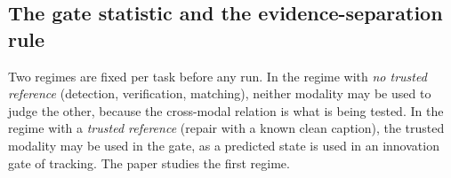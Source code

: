\begin{algorithm}[t]
\caption{\textsc{MaskedScore}: log-likelihood of target tokens under a mask pattern}\label{alg:maskedscore}
\Input{sequence $x$; target positions $P$; extra masked positions $X$; vocabulary slice $[lo,hi)$ of the targets}
\Fn{\textsc{MaskedScore}$(x,P,X,[lo,hi))$}{
  $\tilde x\leftarrow x$; set $\tilde x_P\leftarrow\mask$ and $\tilde x_X\leftarrow\mask$\;
  $\ell\leftarrow$ logits of $\tilde x$ \Comment*[r]{one network pass; batched with others}
  \For{$j\in P$}{
    $\eta_j\leftarrow\mathrm{logsoftmax}_{\fp}\big(\ell_{j,[lo,hi)}\big)$\;
    $\lambda_j\leftarrow\eta_j[x_j-lo]$ and $\pi^{\max}_j\leftarrow\exp\max\eta_j$\;
  }
  \Return $(\lambda,\pi^{\max})$\;
}
\end{algorithm}

\subsection{The gate statistic and the evidence-separation rule}\label{ssec:separation}
Two regimes are fixed per task before any run.
In the regime with \emph{no trusted reference} (detection, verification, matching), neither modality may be used to judge
the other, because the cross-modal relation is what is being tested.
In the regime with a \emph{trusted reference} (repair with a known clean caption), the trusted modality may be used in the gate,
as a predicted state is used in an innovation gate of tracking.
The paper studies the first regime.

